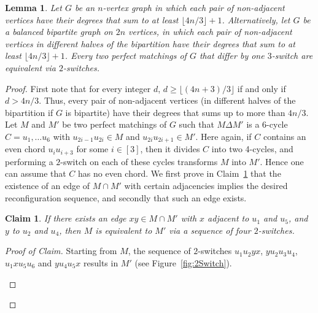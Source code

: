 \documentclass[11pt,a4paper]{article}
\newtheorem{lemma}[theorem]{Lemma}
\newtheorem{claim}[theorem]{Claim}
\theoremstyle{definition}
\newenvironment{poc}{\begin{proof}[Proof of
    Claim]\renewcommand*{\qedsymbol}{$\blacksquare$}}{\end{proof}}
\begin{document}
\begin{lemma}\label{lem:2Switch}
  Let $G$ be an $n$-vertex graph in which each pair of non-adjacent vertices have their degrees that sum to at least $\lfloor 4n/3\rfloor+1$.
  Alternatively, let $G$ be a balanced bipartite graph on $2n$ vertices, in which each pair of non-adjacent vertices in different halves of the bipartition have their degrees that sum to at least $\lfloor 4n/3\rfloor+1$.
  Every two perfect matchings of $G$ that differ by one $3$-switch are equivalent via $2$-switches.
\end{lemma}
\begin{proof}
  First note that for every integer $d$, $d \ge \lfloor (4n+3)/3 \rfloor$ if and only if $d > 4n/3$. Thus, every pair of non-adjacent vertices (in different halves of the bipartition if $G$ is bipartite) have their degrees that sums up to more than $4n/3$.
  Let $M$ and $M'$ be two perfect matchings of $G$ such that $M \Delta M'$ is a
  6-cycle $C = u_1, \dots u_6$ with $u_{2i-1}u_{2i} \in M$ and
  $u_{2i}u_{2i+1} \in M'$. Here again, if $C$ contains an even chord
  $u_iu_{i+3}$ for some $i \in [3]$, then it divides $C$ into two 4-cycles, and
  performing a $2$-switch on each of these cycles transforms $M$ into $M'$. Hence
  one can assume that $C$ has no even chord. We first prove in Claim~\ref{cl:2Switch}
  that the existence of an edge of $M\cap M'$ with certain adjacencies implies
  the desired reconfiguration sequence, and secondly that such an edge exists.

  \begin{claim}\label{cl:2Switch}
    If there exists an edge $xy \in M \cap M'$ with $x$ adjacent to $u_1$ and
    $u_5$, and $y$ to $u_2$ and $u_4$, then $M$ is equivalent to $M'$ via a
    sequence of four $2$-switches. 
  \end{claim}
  \begin{poc}
    Starting from $M$, the sequence of $2$-switches $u_1u_2yx$, $yu_2u_3u_4$,
    $u_1xu_5u_6$ and $yu_4u_5x$ results in $M'$ (see Figure~\ref{fig:2Switch}).
    \begin{figure}[ht!]
    \centering        
\end{figure}
\end{poc}
\end{proof}
\end{document}
